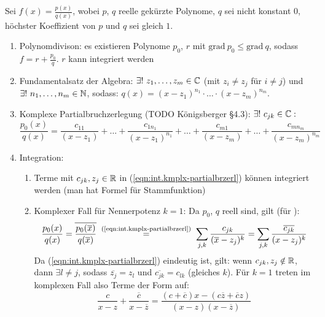 \documentclass[12pt]{scrreprt}
\begin{document}

\begin{bem}
  Sei $f(x)=\frac{p(x)}{q(x)}$, wobei $p$, $q$ reelle gekürzte
  Polynome, $q$ sei nicht konstant $0$, höchster Koeffizient von $p$
  und $q$ sei gleich $1$.
  \begin{enumerate}
  \item Polynomdivison: es existieren Polynome $p_0$, $r$ mit
    $\mathrm{grad}\ p_0 \le \mathrm{grad}\ q$, sodass
    $f=r+\frac{p_0}{q}$. \folgt $r$ kann integriert werden
  \item \label{par:int.fundamentalsatz-algebra} Fundamentalsatz der Algebra: $\exists!\
    z_1,\dotsc,z_m\in\mathbb{C}$ (mit $z_i\ne z_j$ für $i\ne j$) und
    $\exists!\ n_1,\dotsc,n_m\in\set{N}$, sodass:
    $q(x)=(x-z_1)^{n_1}\cdot\dotsc\cdot(x-z_m)^{n_m}$.
    \item Komplexe Partialbruchzerlegung (TODO Königsberger §4.3): $\exists!\ c_{jk}\in\mathbb{C}:$
      \begin{equation}
        \label{eqn:int.kmplx-partialbrzerl}
        \frac{p_0(x)}{q(x)} =
        \frac{c_{11}}{(x-z_1)}+\dotsc+\frac{c_{1n_1}}{(x-z_1)^{n_1}} +
        \dotsc + \frac{c_{m1}}{(x-z_m)}+\dotsc+\frac{c_{mn_m}}{(x-z_m)^{n_m}}
      \end{equation}
    \item Integration:
      \begin{enumerate}
      \item Terme mit $c_{jk},z_j\in\mathbb{R}$ in
        (\ref{eqn:int.kmplx-partialbrzerl}) können integriert werden
        (man hat Formel für Stammfunktion)
      \item Komplexer Fall für Nennerpotenz $k=1$: Da $p_0$, $q$
        reell sind, gilt (für \kmplx{x}):
        \[\frac{p_0(x)}{q(x)} =
        \overline{\frac{p_0(\overline{x})}{q(\overline{x})}}
        \nach{=}{(\ref{eqn:int.kmplx-partialbrzerl})}
        \sum_{j,k}{\frac{c_{jk}}{(\overline{x}-z_j)^k}} =
        \sum_{j,k}{\frac{\overline{c_{jk}}}{(x-z_j)^k}}\]
        Da (\ref{eqn:int.kmplx-partialbrzerl}) eindeutig ist, gilt:
        wenn $c_{jk},z_j\notin\mathbb{R}$, dann $\exists l\ne j$, sodass
        $\overline{z_j}=z_l$ und $\overline{c_{jk}}=c_{lk}$ (gleiches
        $k$). Für $k=1$ treten im komplexen Fall also Terme der Form
        auf:
        \begin{equation}
          \label{eqn:int.terme-komplex}
          \frac{c}{x-z}+\frac{\overline{c}}{x-\overline{z}} =
          \frac{(c+\overline{c})x-(c\overline{z}+\overline{c}z)}{(x-z)(x-\overline{z})}

\end{equation}
\end{enumerate}
\end{enumerate}
\end{bem}
\end{document}
